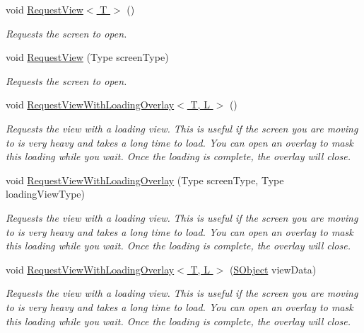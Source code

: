 \begin{DoxyCompactItemize}
\item 
void \hyperlink{class_scaffolding_1_1_view_manager_base_a3afde7ee1eb394797bba9d334e85cd6e}{Request\+View$<$ T $>$} ()
\begin{DoxyCompactList}\small\item\em Requests the screen to open. \end{DoxyCompactList}\item 
void \hyperlink{class_scaffolding_1_1_view_manager_base_a9707174312efe777211b7ade13cf9ce4}{Request\+View} (Type screen\+Type)
\begin{DoxyCompactList}\small\item\em Requests the screen to open. \end{DoxyCompactList}\item 
void \hyperlink{class_scaffolding_1_1_view_manager_base_a367f6c39d23aa731eb747bb0b9fc0b67}{Request\+View\+With\+Loading\+Overlay$<$ T, L $>$} ()
\begin{DoxyCompactList}\small\item\em Requests the view with a loading view. This is useful if the screen you are moving to is very heavy and takes a long time to load. You can open an overlay to mask this loading while you wait. Once the loading is complete, the overlay will close. \end{DoxyCompactList}\item 
void \hyperlink{class_scaffolding_1_1_view_manager_base_ae56fe5f11df7c468d9a99938b0757e45}{Request\+View\+With\+Loading\+Overlay} (Type screen\+Type, Type loading\+View\+Type)
\begin{DoxyCompactList}\small\item\em Requests the view with a loading view. This is useful if the screen you are moving to is very heavy and takes a long time to load. You can open an overlay to mask this loading while you wait. Once the loading is complete, the overlay will close. \end{DoxyCompactList}\item 
void \hyperlink{class_scaffolding_1_1_view_manager_base_a3afa59b6a26b3aab4f2e426cc9b827c3}{Request\+View\+With\+Loading\+Overlay$<$ T, L $>$} (\hyperlink{class_scaffolding_1_1_s_object}{S\+Object} view\+Data)
\begin{DoxyCompactList}\small\item\em Requests the view with a loading view. This is useful if the screen you are moving to is very heavy and takes a long time to load. You can open an overlay to mask this loading while you wait. Once the loading is complete, the overlay will close. \end{DoxyCompactList}\item 

\end{DoxyCompactItemize}
